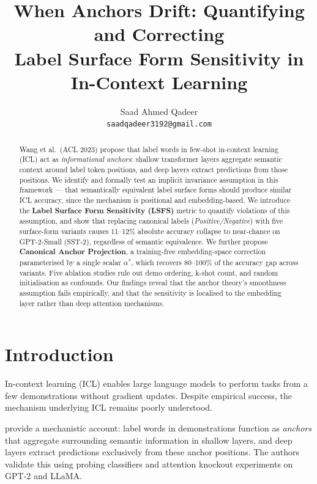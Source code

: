 \documentclass[11pt,a4paper]{article}
\title{\textbf{When Anchors Drift: Quantifying and Correcting\\
Label Surface Form Sensitivity in In-Context Learning}}
\author{
  Saad Ahmed Qadeer \\
  \texttt{saadqadeer3192@gmail.com}
}
\date{}
\begin{document}
\maketitle

\begin{abstract}
Wang et al.\ (ACL 2023) propose that label words in few-shot
in-context learning (ICL) act as \emph{informational anchors}:
shallow transformer layers aggregate semantic context around
label token positions, and deep layers extract predictions
from those positions. We identify and formally test an
implicit invariance assumption in this framework — that
semantically equivalent label surface forms should produce
similar ICL accuracy, since the mechanism is positional and
embedding-based. We introduce the \textbf{Label Surface Form
Sensitivity (LSFS)} metric to quantify violations of this
assumption, and show that replacing canonical labels
(\textit{Positive/Negative}) with five surface-form variants
causes 11--12\% absolute accuracy collapse to near-chance
on GPT-2-Small (SST-2), regardless of semantic equivalence.
We further propose \textbf{Canonical Anchor Projection}, a
training-free embedding-space correction parameterised by a
single scalar $\alpha^*$, which recovers 80--100\% of the
accuracy gap across variants. Five ablation studies rule out
demo ordering, k-shot count, and random initialisation as
confounds. Our findings reveal that the anchor theory's
smoothness assumption fails empirically, and that the
sensitivity is localised to the embedding layer rather than
deep attention mechanisms.
\end{abstract}

\section{Introduction}

In-context learning (ICL) \citep{brown2020gpt3} enables large
language models to perform tasks from a few demonstrations
without gradient updates. Despite empirical success, the
mechanism underlying ICL remains poorly understood.

\citet{wang2023label} provide a mechanistic account: label
words in demonstrations function as \emph{anchors} that
aggregate surrounding semantic information in shallow layers,
and deep layers extract predictions exclusively from these
anchor positions. The authors validate this using probing
classifiers and attention knockout experiments on GPT-2 and
LLaMA.
\end{document}
